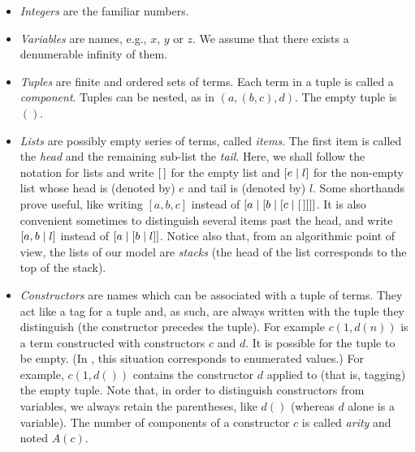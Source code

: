 \begin{itemize}

  \item \emph{Integers} are the familiar numbers.

  \item \emph{Variables} are names, e.g., \(x\), \(y\) or \(z\). We
    assume that there exists a denumerable infinity of them.

  \item \emph{Tuples} are finite and ordered sets of terms.  Each term
    in a tuple is called a \emph{component}. Tuples can be nested, as
    in \((a, (b, c), d)\).  The empty tuple is \(()\).

  \item \emph{Lists} are possibly empty series of terms, called
    \emph{items}. The first item is called the \emph{head} and the
    remaining sub\hyp{}list the \emph{tail}. Here, we shall follow the
    \Prolog notation for lists and write \([\,]\) for the empty list
    and \([{e}\mid{l}]\) for the non\hyp{}empty list whose head is
    (denoted by) \(e\) and tail is (denoted by) \(l\). Some shorthands
    prove useful, like writing \([a, b, c]\) instead of
    \([{a}\mid{[{b}\mid{[{c}\mid{[\,]}]}]}]\). It is also convenient
    sometimes to distinguish several items past the head, and write
    \([{a, b}\mid{l}]\) instead of \([{a}\mid{[{b}\mid{l}]}]\).  Notice
    also that, from an algorithmic point of view, the lists of our
    model are \emph{stacks} (the head of the list corresponds to the
    top of the stack).

  \item \emph{Constructors} are names which can be associated with a
    tuple of terms. They act like a tag for a tuple and, as such, are
    always written with the tuple they distinguish (the constructor
    precedes the tuple).  For example \(c(1, d(n))\) is a term
    constructed with constructors \(c\) and \(d\). It is possible for
    the tuple to be empty. (In \Clang, this situation corresponds to
    enumerated values.)  For example, \(c(1, d())\) contains the
    constructor \(d\) applied to (that is, tagging) the empty tuple.
    Note that, in order to distinguish constructors from variables, we
    always retain the parentheses, like \(d()\) (whereas \(d\) alone
    is a variable). The number of components of a constructor \(c\) is
    called \emph{arity} and noted \(A(c)\).

\end{itemize}
\smallskip
